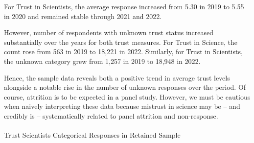 \documentclass[
  single column]{article}
\makeatletter
\let\oldparagraph\paragraph
\renewcommand{\paragraph}{
    \@ifstar
      \xxxParagraphStar
      \xxxParagraphNoStar
  }
\newcommand{\xxxParagraphStar}[1]{\oldparagraph*{#1}\mbox{}}
\newcommand{\xxxParagraphNoStar}[1]{\oldparagraph{#1}\mbox{}}
\makeatother
\begin{document}
For Trust in Scientists, the average response increased from 5.30 in
2019 to 5.55 in 2020 and remained stable through 2021 and 2022.

However, number of respondents with unknown trust status increased
substantially over the years for both trust measures. For Trust in
Science, the count rose from 563 in 2019 to 18,221 in 2022. Similarly,
for Trust in Scientists, the unknown category grew from 1,257 in 2019 to
18,948 in 2022.

Hence, the sample data reveals both a positive trend in average trust
levels alongside a notable rise in the number of unknown responses over
the period. Of course, attrition is to be expected in a panel study.
However, we must be cautious when naively interpreting these data
because mistrust in science may be -- and credibly is -- systematically
related to panel attrition and non-response.

\paragraph{Trust Scientists Categorical Responses in Retained
Sample}\label{trust-scientists-categorical-responses-in-retained-sample}
\end{document}
